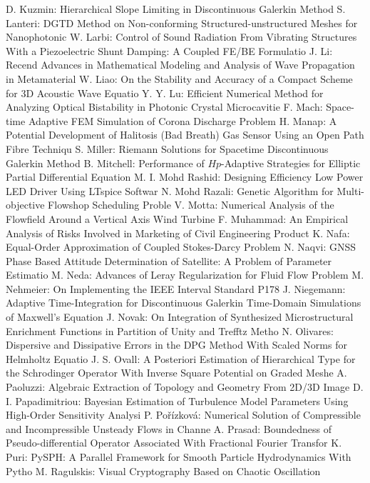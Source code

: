 \documentclass[10pt, A4]{article}%
\begin{document}
{D. Kuzmin}: {Hierarchical Slope Limiting in  Discontinuous Galerkin Method}
{S. Lanteri}: {DGTD  Method  on  Non-conforming  Structured-unstructured  Meshes  for Nanophotonic}
{W. Larbi}: {Control of Sound Radiation From Vibrating Structures With a Piezoelectric Shunt Damping: A Coupled FE/BE Formulatio}
{J. Li}: {Recend Advances in Mathematical Modeling and Analysis of Wave Propagation in Metamaterial}
{W. Liao}: {On the Stability and Accuracy of a Compact Scheme for 3D Acoustic Wave Equatio}
{Y. Y. Lu}: {Efficient Numerical Method for Analyzing Optical Bistability in Photonic Crystal Microcavitie}
{F. Mach}: {Space-time Adaptive FEM Simulation of Corona Discharge Problem}
{H. Manap}: {A Potential Development of Halitosis (Bad Breath) Gas Sensor Using an Open Path Fibre Techniqu}
{S. Miller}: {Riemann Solutions for Spacetime Discontinuous Galerkin Method}
{B. Mitchell}: {Performance of $Hp$-Adaptive Strategies for Elliptic Partial Differential Equation}
{M. I. Mohd Rashid}: {Designing Efficiency Low Power LED Driver Using LTspice Softwar}
{N. Mohd Razali}: {Genetic Algorithm for Multi-objective Flowshop Scheduling Proble}
{V. Motta}: {Numerical Analysis of the Flowfield Around a Vertical Axis Wind Turbine}
{F. Muhammad}: {An Empirical Analysis of Risks Involved in Marketing of Civil Engineering Product}
{K. Nafa}: {Equal-Order Approximation of Coupled Stokes-Darcy Problem}
{N. Naqvi}: {GNSS Phase Based Attitude Determination of Satellite: A Problem of Parameter Estimatio}
{M. Neda}: {Advances of Leray Regularization for Fluid Flow Problem}
{M. Nehmeier}: {On Implementing  the IEEE Interval Standard P178}
{J. Niegemann}: {Adaptive Time-Integration for Discontinuous Galerkin Time-Domain Simulations of Maxwell's Equation}
{J. Novak}: {On Integration of Synthesized Microstructural Enrichment Functions in Partition of Unity and Trefftz Metho}
{N. Olivares}: {Dispersive and Dissipative Errors in the DPG Method With Scaled Norms for Helmholtz Equatio}
{J. S. Ovall}: {A Posteriori Estimation of Hierarchical Type for the  Schrodinger Operator With Inverse Square Potential on Graded Meshe}
{A. Paoluzzi}: {Algebraic Extraction of Topology and Geometry From 2D/3D Image}
{D. I. Papadimitriou}: {Bayesian Estimation of Turbulence Model Parameters Using High-Order Sensitivity Analysi}
{P. Pořízková}: {Numerical Solution of Compressible and Incompressible Unsteady Flows in Channe}
{A. Prasad}: {Boundedness of Pseudo-differential Operator Associated With Fractional Fourier Transfor}
{K. Puri}: {PySPH: A Parallel Framework for Smooth Particle Hydrodynamics With Pytho}
{M. Ragulskis}: {Visual Cryptography Based on Chaotic Oscillation}
\end{document}
